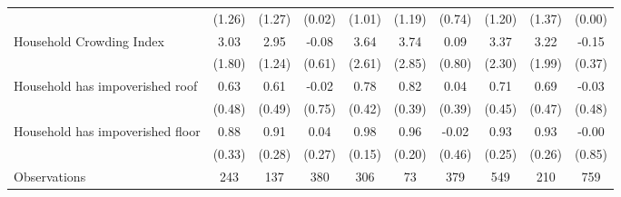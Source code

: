 \begin{tabular}{l*{9}c}
&(1.26)&(1.27)&(0.02)&(1.01)&(1.19)&(0.74)&(1.20)&(1.37)&(0.00)\\
Household Crowding Index&3.03&2.95&-0.08&3.64&3.74&0.09&3.37&3.22&-0.15\\
&(1.80)&(1.24)&(0.61)&(2.61)&(2.85)&(0.80)&(2.30)&(1.99)&(0.37)\\
Household has impoverished roof&0.63&0.61&-0.02&0.78&0.82&0.04&0.71&0.69&-0.03\\
&(0.48)&(0.49)&(0.75)&(0.42)&(0.39)&(0.39)&(0.45)&(0.47)&(0.48)\\
Household has impoverished floor&0.88&0.91&0.04&0.98&0.96&-0.02&0.93&0.93&-0.00\\
&(0.33)&(0.28)&(0.27)&(0.15)&(0.20)&(0.46)&(0.25)&(0.26)&(0.85)\\
\hline
Observations & 243 & 137 & 380 & 306 & 73 & 379 & 549 & 210 & 759 \\
\hline\hline
\end{tabular}
